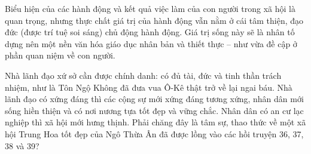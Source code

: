 Biểu hiện của các hành động và kết quả việc làm của con người trong xã hội là quan trọng, nhưng thực chất giá trị của hành động vẫn nằm ở cái tâm thiện, đạo đức (được trí tuệ soi sáng) chủ động hành động. Giá trị sống này sẽ là nhân tố dựng nên một nền văn hóa giáo dục nhân bản và thiết thực -- như vừa đề cập ở phần quan niệm về con người.

Nhà lãnh đạo xứ sở cần được chính danh: có đủ tài, đức và tinh thần trách nhiệm, như là Tôn Ngộ Không đã đưa vua Ô-Kê thật trở về lại ngai báu. Nhà lãnh đạo có xứng đáng thì các cộng sự mới xứng đáng tương xứng, nhân dân mới sống hiền thiện và có nơi nương tựa tốt đẹp và vững chắc. Nhân dân có an cư lạc nghiệp thì xã hội mới hưng thịnh. Phải chăng đây là tâm sự, thao thức về một xã hội Trung Hoa tốt đẹp của Ngô Thừa Ân đã được lồng vào các hồi truyện 36, 37, 38 và 39?
